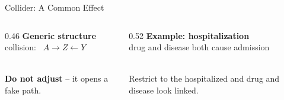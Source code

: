 \documentclass[aspectratio=169]{beamer}
\begin{document}
\begin{frame}{Collider: A Common Effect}
  \small
  \begin{columns}[T]
    \begin{column}{0.46\textwidth}
      \centering
      \textbf{Generic structure}\\ {\scriptsize collision: \ $A \to Z \leftarrow Y$}\\[0.9em]
      \\[0.9em]
      \textcolor{brick}{\textbf{Do not adjust}} -- it opens a fake path.
    \end{column}
    \begin{column}{0.52\textwidth}
      \centering
      \textbf{Example: hospitalization}\\ {\scriptsize drug and disease both cause admission}\\[0.9em]
      \\[0.9em]
      {\scriptsize Restrict to the hospitalized and drug and disease look linked. }
    \end{column}
  \end{columns}
\end{frame}
\end{document}
